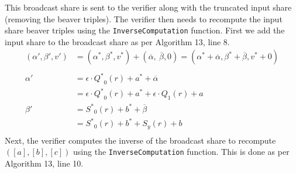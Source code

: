 \documentclass[twoside,11pt]{report}
\theoremstyle{definition}
\theoremstyle{plain}
\begin{document}
This broadcast share is sent to the verifier along with the truncated input share (removing the beaver triples). The verifier then needs to recompute the input share beaver triples using the \texttt{InverseComputation} function. First we add the input share to the broadcast share as per Algorithm 13, line 8.
\begin{align*}
  (\alpha', \beta', v') & = (\alpha^*, \beta^*, v^*) + (\overline{\alpha},\ \overline{\beta}, 0)
  = (\alpha^* + \overline{\alpha}, \beta^* + \overline{\beta}, v^* + 0)                          \\\\
  \alpha'               & = \epsilon \cdot {Q^*}_0(r) + a^* + \overline{\alpha}                  \\
                        & = \epsilon \cdot {Q^*}_0(r) + a^* + \epsilon \cdot Q_1(r) + a          \\
  \beta'                & = {S^*}_0(r) + b^* + \overline{\beta}                                  \\
                        & = {S^*}_0(r) + b^* + S_y(r) + b                                        \\
\end{align*}
Next, the verifier computes the inverse of the broadcast share to recompute $([a], [b], [c])$ using the \texttt{InverseComputation} function. This is done as per Algorithm 13, line 10.
\end{document}
